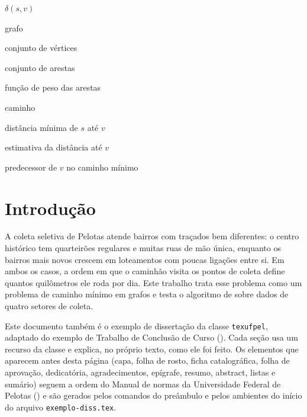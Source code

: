 \documentclass[diss,capa]{texufpel}
\begin{document}
\begin{listofsymbols}{$\delta(s, v)$}
  \item[$G$]            grafo
  \item[$V$]            conjunto de vértices
  \item[$E$]            conjunto de arestas
  \item[$w$]            função de peso das arestas
  \item[$p$]            caminho
  \item[$\delta(s, v)$] distância mínima de $s$ até $v$
  \item[{$d[v]$}]       estimativa da distância até $v$
  \item[{$\pi[v]$}]     predecessor de $v$ no caminho mínimo
\end{listofsymbols}

\tableofcontents

\chapter{Introdução}
\label{cap:introducao}

A coleta seletiva de Pelotas atende bairros com traçados bem diferentes: o
centro histórico tem quarteirões regulares e muitas ruas de mão única, enquanto
os bairros mais novos crescem em loteamentos com poucas ligações entre si.
Em ambos os casos, a ordem em que o caminhão visita os pontos de coleta define
quantos quilômetros ele roda por dia. Este trabalho trata esse problema como
um problema de caminho mínimo em grafos e testa o algoritmo de
\citet{Dijkstra:1959:NTP} sobre dados de quatro setores de coleta.

Este documento também é o exemplo de dissertação da classe
\texttt{texufpel}, adaptado do exemplo de Trabalho de Conclusão de Curso
(). Cada seção usa um
recurso da classe e explica, no próprio texto, como ele foi feito. Os elementos que aparecem antes
desta página (capa, folha de rosto, ficha catalográfica, folha de aprovação,
dedicatória, agradecimentos, epígrafe, resumo, abstract, listas e sumário)
seguem a ordem do Manual de normas da Universidade Federal de Pelotas
() e são gerados pelos comandos do
preâmbulo e pelos ambientes do início do arquivo \texttt{exemplo-diss.tex}.
\end{document}

